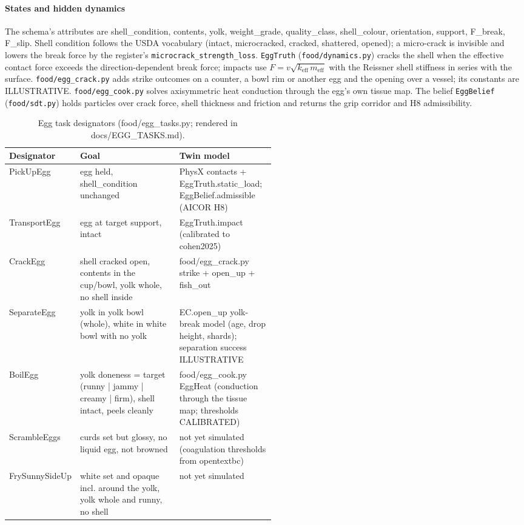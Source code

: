 \documentclass[10.5pt,a4paper]{article}
\begin{document}
\paragraph{States and hidden dynamics} The schema's attributes are shell\_condition, contents, yolk, weight\_grade, quality\_class, shell\_colour, orientation, support, F\_break, F\_slip. Shell condition follows the USDA vocabulary (intact, microcracked, cracked, shattered, opened); a
micro-crack is invisible and lowers the break force by the register's \texttt{microcrack\_strength\_loss}.
\texttt{EggTruth} (\texttt{food/dynamics.py}) cracks the shell when the effective contact force exceeds the
direction-dependent break force; impacts use $F = v\sqrt{k_\mathrm{eff}\, m_\mathrm{eff}}$ with the Reissner shell
stiffness in series with the surface. \texttt{food/egg\_crack.py} adds strike outcomes on a counter, a bowl rim or
another egg and the opening over a vessel; its constants are ILLUSTRATIVE. \texttt{food/egg\_cook.py} solves
axisymmetric heat conduction through the egg's own tissue map. The belief \texttt{EggBelief} (\texttt{food/sdt.py})
holds particles over crack force, shell thickness and friction and returns the grip corridor and H8 admissibility.
\begin{table}[htbp]\centering\scriptsize\caption{Egg task designators (food/egg\_tasks.py; rendered in docs/EGG\_TASKS.md).}
\begin{tabularx}{\linewidth}{@{}p{0.15\linewidth}Xp{0.36\linewidth}@{}}\toprule Designator & Goal & Twin model \\\midrule
PickUpEgg & egg held, shell\_condition unchanged & PhysX contacts + EggTruth.static\_load; EggBelief.admissible (AICOR H8) \\
TransportEgg & egg at target support, intact & EggTruth.impact (calibrated to cohen2025) \\
CrackEgg & shell cracked open, contents in the cup/bowl, yolk whole, no shell inside & food/egg\_crack.py strike + open\_up + fish\_out \\
SeparateEgg & yolk in yolk bowl (whole), white in white bowl with no yolk & EC.open\_up yolk-break model (age, drop height, shards); separation success ILLUSTRATIVE \\
BoilEgg & yolk doneness = target (runny | jammy | creamy | firm), shell intact, peels cleanly & food/egg\_cook.py EggHeat (conduction through the tissue map; thresholds CALIBRATED) \\
ScrambleEggs & curds set but glossy, no liquid egg, not browned & not yet simulated (coagulation thresholds from opentextbc) \\
FrySunnySideUp & white set and opaque incl. around the yolk, yolk whole and runny, no shell & not yet simulated \\\bottomrule\end{tabularx}\end{table}
\end{document}
